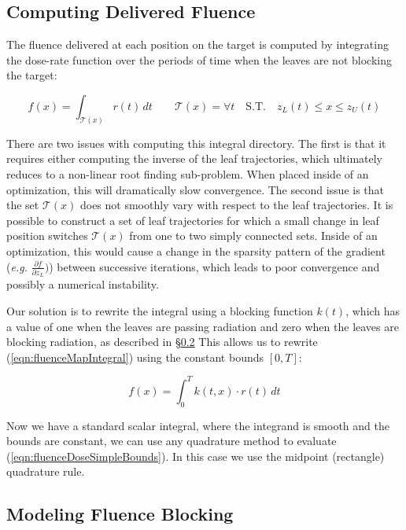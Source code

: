 \subsection{Computing Delivered Fluence}

The fluence delivered at each position on the target is computed by integrating the
dose-rate function over the periods of time when the leaves are not blocking the target:

\begin{equation}
  f(x) = \int_{\mathcal{T}(x)} \! r(t) \,dt
  \quad \quad
  \mathcal{T}(x) = \forall t
  \quad
  \text{S.T.}
  \quad
  z_L(t) \leq x \leq z_U(t)
  \label{eqn:fluenceMapIntegral}
\end{equation}

There are two issues with computing this integral directory.
The first is that it requires either computing the inverse of the leaf trajectories,
which ultimately reduces to a non-linear root finding sub-problem.
When placed inside of an optimization, this will dramatically slow convergence.
The second issue is that the set $\mathcal{T}(x)$ does not smoothly vary with respect to the leaf trajectories.
It is possible to construct a set of leaf trajectories for which a small change in leaf position
switches $\mathcal{T}(x)$ from one to two simply connected sets.
Inside of an optimization, this would cause a change in the sparsity pattern of the gradient
(\textit{e.g.} $\tfrac{\partial f}{\partial z_L})$)
between successive iterations,
which leads to poor convergence and possibly a numerical instability.

Our solution is to rewrite the integral using a blocking function $k(t)$,
which has a value of one when the leaves are passing radiation and
zero when the leaves are blocking radiation, as described in \S\ref{sec:modelingFluenceBlocking}
This allows us to rewrite (\ref{eqn:fluenceMapIntegral}) using the constant bounds $[0, T]$:

\begin{equation}
  f(x) = \int_0^T \! k(t, x) \cdot r(t) \, dt
  \label{eqn:fluenceDoseSimpleBounds}
\end{equation}

Now we have a standard scalar integral, where the integrand is smooth and the
bounds are constant, we can use any quadrature method to evaluate (\ref{eqn:fluenceDoseSimpleBounds}).
In this case we use the midpoint (rectangle) quadrature rule.

\subsection{Modeling Fluence Blocking}
\label{sec:modelingFluenceBlocking}

